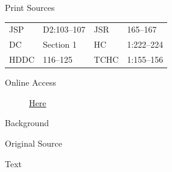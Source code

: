 {			\begin{description}
				\item[Print Sources]
			\end{description}

				\begin{tabular}{p{0.5in}p{1in}p{0.5in}p{1in}}
				JSP	 	& D2:103--107	& JSR 		& 165--167 \\
				DC	 	& Section 1	 	& HC 		& 1:222--224 \\
				HDDC 	& 116--125		& TCHC 		& 1:155--156 \\
				\end{tabular}
			
			\begin{description}
				\item[Online Access] \href{https://www.josephsmithpapers.org/paper-summary/revelation-1-november-1831-b-dc-1/1}{Here}
			\end{description}
			
			\begin{description}
				\item[Background]
			\end{description}
			
			
			\begin{description}
				\item[Original Source]
			\end{description}
			
			
			\begin{description}
				\item[Text]
			\end{description}
			
}
